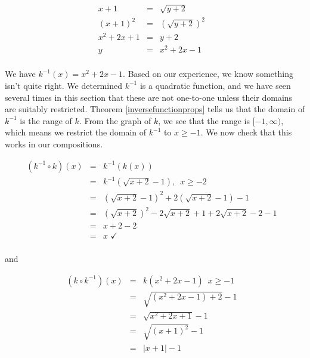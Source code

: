 \begin{ex}
\begin{enumerate}
\[\begin{array}{rclr}
x+1 & = & \sqrt{y+2} & \\

(x+1)^2 & = & \left(\sqrt{y+2}\right)^2 & \\

x^2 + 2x + 1 & = & y + 2 & \\

y & = & x^2 + 2x - 1 & \\

\end{array} \]

We have $k^{-1}(x) = x^2+2x-1$.  Based on our experience, we know something isn't quite right.  We determined $k^{-1}$ is a quadratic function, and we have seen several times in this section that these are not one-to-one unless their domains are suitably restricted.  Theorem \ref{inversefunctionprops} tells us that the domain of $k^{-1}$ is the range of $k$.  From the graph of $k$, we see that the range is $[-1, \infty)$, which means we restrict the domain of $k^{-1}$ to $x \geq -1$. We now check that this works in our compositions.

\[ \begin{array}{rclr}

\left(k^{-1} \circ k \right)(x) & = & k^{-1}(k(x)) & \\ 

& = & k^{-1}\left(\sqrt{x+2}-1\right), \, \, \, x \geq -2 & \\
& = & \left(\sqrt{x+2}-1\right)^2 + 2\left(\sqrt{x+2}-1\right) - 1& \\
& = & \left(\sqrt{x+2}\right)^2 - 2\sqrt{x+2} + 1 + 2 \sqrt{x+2} - 2 - 1 & \\
& = &x+2 -2  & \\
& = & x \, \, \checkmark &\\
\end{array}\]

and


\[ \begin{array}{rclr}

\left(k \circ k^{-1} \right)(x) & = & k\left( x^2+2x-1 \right) \, \, \, x \geq -1 & \\ 

& = & \sqrt{\left(x^2+2x-1\right)+2}-1 & \\

& = & \sqrt{x^2+2x+1}-1 & \\

& = & \sqrt{(x+1)^2}-1 & \\

& = & |x+1| -1 & \\


\end{array}\]
\end{enumerate}
\end{ex}

